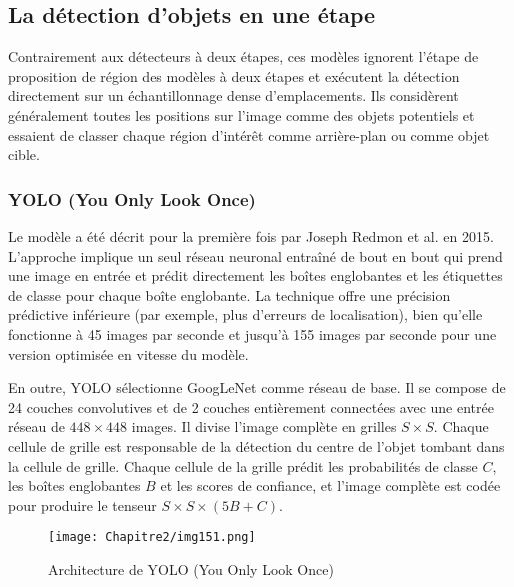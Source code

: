     
     
\subsection{La détection d'objets en une étape}
Contrairement aux détecteurs à deux étapes, ces modèles ignorent l'étape de proposition de région des modèles à deux étapes et exécutent la détection directement sur un échantillonnage dense d'emplacements. Ils considèrent généralement toutes les positions sur l'image comme des objets potentiels et essaient de classer chaque région d'intérêt comme arrière-plan ou comme objet cible.

\subsubsection{YOLO (You Only Look Once) \cite{yolo_paper} }

Le modèle a été décrit pour la première fois par Joseph Redmon et al. en 2015. 
L'approche implique un seul réseau neuronal entraîné de bout en bout qui prend une image en entrée et prédit directement les boîtes englobantes et les étiquettes de classe pour chaque boîte englobante. La technique offre une précision prédictive inférieure (par exemple, plus d'erreurs de localisation), bien qu'elle fonctionne à 45 images par seconde et jusqu'à 155 images par seconde pour une version optimisée en vitesse du modèle.

En outre, YOLO sélectionne GoogLeNet comme réseau de base. Il se compose de 24 couches convolutives et de 2 couches entièrement connectées avec une entrée réseau de $448 \times 448$ images. Il divise l'image complète en grilles $S \times S$. Chaque cellule de grille est responsable de la détection du centre de l'objet tombant dans la cellule de grille. Chaque cellule de la grille prédit les probabilités de classe $C$, les boîtes englobantes $B$ et les scores de confiance, et l'image complète est codée pour produire le tenseur $S \times S \times(5B+C)$.

     \begin{figure}[H]
          \centering
          \texttt{[image: Chapitre2/img151.png]}
          \caption{Architecture de YOLO (You Only Look Once)}
          \label{img15}
          \end{figure}


